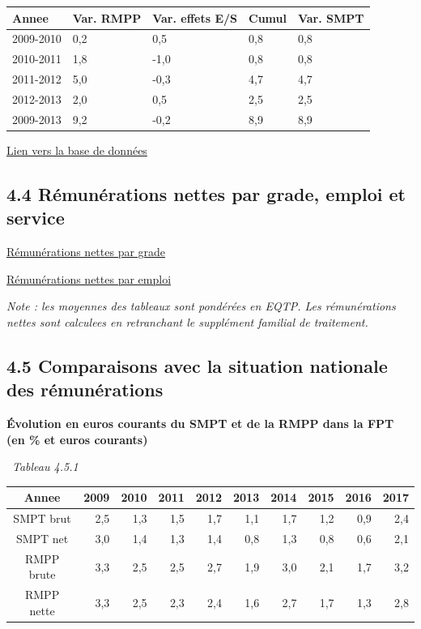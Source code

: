 \begin{longtable}[]{@{}lllll@{}}
\toprule
Annee & Var. RMPP & Var. effets E/S & Cumul & Var. SMPT\tabularnewline
\midrule
\endhead
2009-2010 & 0,2 & 0,5 & 0,8 & 0,8\tabularnewline
2010-2011 & 1,8 & -1,0 & 0,8 & 0,8\tabularnewline
2011-2012 & 5,0 & -0,3 & 4,7 & 4,7\tabularnewline
2012-2013 & 2,0 & 0,5 & 2,5 & 2,5\tabularnewline
2009-2013 & 9,2 & -0,2 & 8,9 & 8,9\tabularnewline
\bottomrule
\end{longtable}

\href{../Bases/Remunerations/Anavar.synthese.csv}{Lien vers la base de
données}

\hypertarget{remunerations-nettes-par-grade-emploi-et-service}{%
\subsection{4.4 Rémunérations nettes par grade, emploi et
service}\label{remunerations-nettes-par-grade-emploi-et-service}}

\href{../Bases/Remunerations/net.grades.csv}{Rémunérations nettes par
grade}

\href{../Bases/Remunerations/net.emplois.csv}{Rémunérations nettes par
emploi}

\emph{Note : les moyennes des tableaux sont pondérées en EQTP. Les
rémunérations nettes sont calculees en retranchant le supplément
familial de traitement.}

\hypertarget{comparaisons-avec-la-situation-nationale-des-remunerations}{%
\subsection{4.5 Comparaisons avec la situation nationale des
rémunérations}\label{comparaisons-avec-la-situation-nationale-des-remunerations}}

\textbf{Évolution en euros courants du SMPT et de la RMPP dans la FPT
(en \% et euros courants)}

~\emph{Tableau 4.5.1}

\begin{longtable}[]{@{}crrrrrrrrr@{}}
\toprule
Annee & 2009 & 2010 & 2011 & 2012 & 2013 & 2014 & 2015 & 2016 &
2017\tabularnewline
\midrule
\endhead
SMPT brut & 2,5 & 1,3 & 1,5 & 1,7 & 1,1 & 1,7 & 1,2 & 0,9 &
2,4\tabularnewline
SMPT net & 3,0 & 1,4 & 1,3 & 1,4 & 0,8 & 1,3 & 0,8 & 0,6 &
2,1\tabularnewline
RMPP brute & 3,3 & 2,5 & 2,5 & 2,7 & 1,9 & 3,0 & 2,1 & 1,7 &
3,2\tabularnewline
RMPP nette & 3,3 & 2,5 & 2,3 & 2,4 & 1,6 & 2,7 & 1,7 & 1,3 &
2,8\tabularnewline
\bottomrule
\end{longtable}

